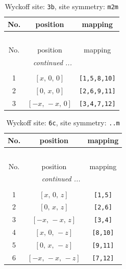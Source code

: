 \documentclass[fleqn,8pt]{jsarticle}
\begin{document}
\begin{longtable}{ccc}
\caption{Wyckoff site: {\tt 3b}, site symmetry: {\tt m2m}}
 \\
 \hline \hline
No. & position & mapping \\ \hline \endfirsthead

\multicolumn{2}{l}{\tablename\ \thetable{}} \\
 \hline \hline
No. & position & mapping \\ \hline \endhead

 \hline \hline
\multicolumn{2}{r}{\footnotesize\it continued ...} \\ \endfoot

 \hline \hline
\multicolumn{2}{r}{} \\ \endlastfoot

1 & $\left[ x,\, 0,\, 0 \right]$ & {\tt [1,5,8,10]} \\ \hline
2 & $\left[ 0,\, x,\, 0 \right]$ & {\tt [2,6,9,11]} \\ \hline
3 & $\left[ - x,\, - x,\, 0 \right]$ & {\tt [3,4,7,12]} \\
\end{longtable}
\renewcommand{\arraystretch}{1.2}
\begin{longtable}{ccc}
\caption{Wyckoff site: {\tt 6c}, site symmetry: {\tt ..m}}
 \\
 \hline \hline
No. & position & mapping \\ \hline \endfirsthead

\multicolumn{2}{l}{\tablename\ \thetable{}} \\
 \hline \hline
No. & position & mapping \\ \hline \endhead

 \hline \hline
\multicolumn{2}{r}{\footnotesize\it continued ...} \\ \endfoot

 \hline \hline
\multicolumn{2}{r}{} \\ \endlastfoot

1 & $\left[ x,\, 0,\, z \right]$ & {\tt [1,5]} \\ \hline
2 & $\left[ 0,\, x,\, z \right]$ & {\tt [2,6]} \\ \hline
3 & $\left[ - x,\, - x,\, z \right]$ & {\tt [3,4]} \\ \hline
4 & $\left[ x,\, 0,\, - z \right]$ & {\tt [8,10]} \\ \hline
5 & $\left[ 0,\, x,\, - z \right]$ & {\tt [9,11]} \\ \hline
6 & $\left[ - x,\, - x,\, - z \right]$ & {\tt [7,12]} \\
\end{longtable}
\end{document}
